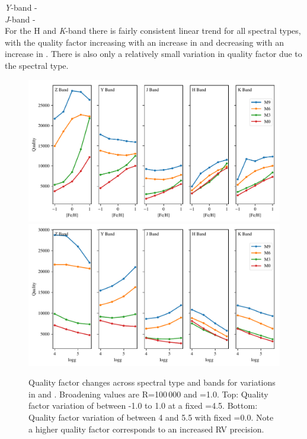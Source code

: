 \emph{Y}-band -\\

\emph{J}-band - \\

For the H and \emph{K}-band there is fairly consistent linear trend for all spectral types, with the quality factor increasing with an increase in \feh{} and decreasing with an increase in \Logg{}.
There is also only a relatively small variation in quality factor due to the spectral type.


\begin{figure}
    \includegraphics[width=0.99\linewidth]{figures/information-content/metalicity_effect.pdf}\\
    \includegraphics[width=0.99\linewidth]{figures/information-content/logg_effect.pdf}
    \caption[Quality factor verse \feh{} and \Logg{} for different spectral types and wavelength bands.]{Quality factor changes across spectral type and bands for variations in \feh{} and \Logg{}.
        Broadening values are R=100\,000 and \Vsini{}=1.0\kmps{}.
        Top: Quality factor variation of \feh{} between -1.0 to 1.0 at a fixed \Logg{}=4.5.
        Bottom: Quality factor variation of \Logg{} between 4 and 5.5 with fixed \feh{}=0.0.
        Note a higher quality factor corresponds to an increased {RV} precision.}
    \label{fig:deviations}
\end{figure}


